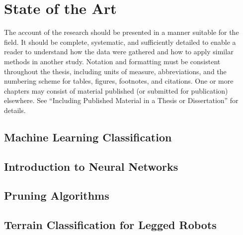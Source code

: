 \chapter{State of the Art}
\label{chapter:01:state_of_the_art}

The account of the research should be presented in a manner suitable for the field. It should be complete, systematic, and sufficiently detailed to enable a reader to understand how the data were gathered and how to apply similar methods in another study. Notation and formatting must be consistent throughout the thesis, including units of measure, abbreviations, and the numbering scheme for tables, figures, footnotes, and citations. One or more chapters may consist of material published (or submitted for publication) elsewhere. See “Including Published Material in a Thesis or Dissertation” for details.

\section{Machine Learning Classification}

\section{Introduction to Neural Networks}

\section{Pruning Algorithms}

\section{Terrain Classification for Legged Robots}
